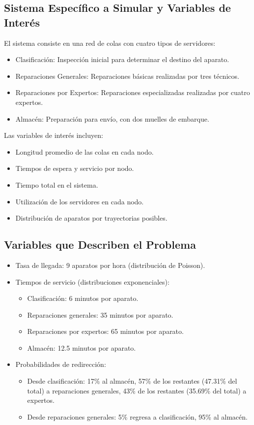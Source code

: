 \documentclass[12pt]{article}
\begin{document}
\subsection{Sistema Específico a Simular y Variables de Interés}
El sistema consiste en una red de colas con cuatro tipos de servidores:
\begin{itemize}
    \item Clasificación: Inspección inicial para determinar el destino del aparato.
    \item Reparaciones Generales: Reparaciones básicas realizadas por tres técnicos.
    \item Reparaciones por Expertos: Reparaciones especializadas realizadas por cuatro expertos.
    \item Almacén: Preparación para envío, con dos muelles de embarque.
\end{itemize}
Las variables de interés incluyen:
\begin{itemize}
    \item Longitud promedio de las colas en cada nodo.
    \item Tiempos de espera y servicio por nodo.
    \item Tiempo total en el sistema.
    \item Utilización de los servidores en cada nodo.
    \item Distribución de aparatos por trayectorias posibles.
\end{itemize}

\subsection{Variables que Describen el Problema}
\begin{itemize}
    \item Tasa de llegada: 9 aparatos por hora (distribución de Poisson).
    \item Tiempos de servicio (distribuciones exponenciales):
    \begin{itemize}
        \item Clasificación: 6 minutos por aparato.
        \item Reparaciones generales: 35 minutos por aparato.
        \item Reparaciones por expertos: 65 minutos por aparato.
        \item Almacén: 12.5 minutos por aparato.
    \end{itemize}
    \item Probabilidades de redirección:
    \begin{itemize}
        \item Desde clasificación: 17\% al almacén, 57\% de los restantes (47.31\% del total) a reparaciones generales, 43\% de los restantes (35.69\% del total) a expertos.
        \item Desde reparaciones generales: 5\% regresa a clasificación, 95\% al almacén.
    \end{itemize}
\end{itemize}
\end{document}
